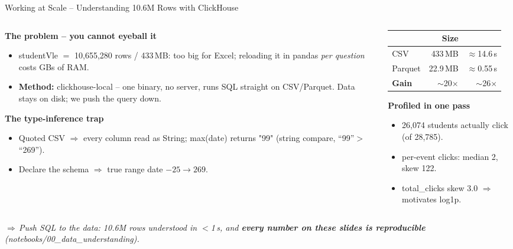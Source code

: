 \documentclass[aspectratio=169,10pt]{beamer}
\newcommand{\hc}[1]{{\bfseries\color{white}#1}}
\newcommand{\tcode}[1]{{\ttfamily #1}}
\newcommand{\takeaway}[1]{\vspace{2pt}\par{\footnotesize\itshape\textcolor{themecol}{$\Rightarrow$\,}#1}}
\begin{document}
\begin{frame}{Working at Scale -- Understanding 10.6M Rows with ClickHouse}
  \begin{columns}[T]
    \begin{column}{0.50\textwidth}
      \footnotesize\textbf{The problem -- you cannot eyeball it}
      \begin{itemize}\setlength\itemsep{0.25em}
        \item \tcode{studentVle} $=$ \alert{10,655,280} rows / \alert{433\,MB}: too big for Excel; reloading it in pandas \emph{per question} costs GBs of RAM.
        \item \textbf{Method:} \tcode{clickhouse-local} -- one binary, no server, runs SQL straight on CSV/Parquet. Data stays on disk; we push the query down.
      \end{itemize}
      \vspace{2pt}
      \textbf{The type-inference trap}
      \begin{itemize}\setlength\itemsep{0.25em}
        \item Quoted CSV $\Rightarrow$ every column read as \tcode{String}; \tcode{max(date)} returns \alert{"99"} (string compare, ``99''$>$``269'').
        \item Declare the schema $\Rightarrow$ true range \tcode{date} \alert{$-25\to269$}.
      \end{itemize}
    \end{column}
    \begin{column}{0.50\textwidth}
      {\footnotesize
      \setlength{\tabcolsep}{6pt}\renewcommand{\arraystretch}{1.3}
      \begin{tabularx}{\textwidth}{@{}l r r@{}}
        \toprule
        \rowcolor{themecol}\hc{} & \hc{Size} & \hc{\tcode{count()}}\\
        \midrule
        CSV      & 433\,MB  & $\approx$14.6\,s\\
        \rowcolor{rowtint}
        Parquet  & 22.9\,MB & $\approx$0.55\,s\\
        \midrule
        \textbf{Gain} & \alert{$\sim$20$\times$} & \alert{$\sim$26$\times$}\\
        \bottomrule
      \end{tabularx}}
      \vspace{3pt}\par\footnotesize\textbf{Profiled in one pass}
      \begin{itemize}\setlength\itemsep{0.2em}
        \item \alert{26,074} students actually click (of 28,785).
        \item per-event clicks: median 2, skew \alert{122}.
        \item \tcode{total\_clicks} skew \alert{3.0} $\Rightarrow$ motivates log1p.
      \end{itemize}
    \end{column}
  \end{columns}
  \takeaway{Push SQL to the data: 10.6M rows understood in $<$1\,s, and \textbf{every number on these slides is reproducible} (\tcode{notebooks/00\_data\_understanding}).}
\end{frame}
\end{document}
